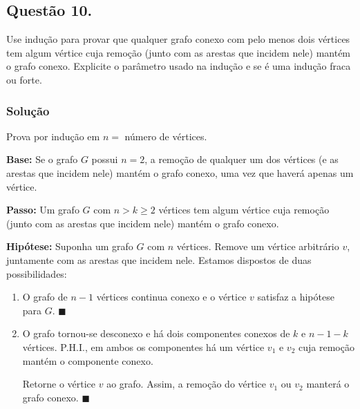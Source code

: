 \documentclass[12pt, letterpaper]{report}
\newcommand*{\CQD}{\hfill\ensuremath{\blacksquare}}%
\newcounter{ProblemNum}
\newcommand*{\anyproblem}[1]{\newpage\subsection*{#1}}
\newcommand*{\problem}[1]{\stepcounter{ProblemNum} %
   \anyproblem{Questão #1}}
\newcommand*{\soln}[1]{\subsubsection*{#1}}
\newcommand*{\solution}{\soln{Solução}}
\begin{document}
\problem{10.}
  Use indução para provar que qualquer grafo conexo com pelo menos dois vértices tem algum vértice cuja remoção (junto com as arestas que incidem nele) mantém o grafo conexo. Explicite o parâmetro usado na indução e se é uma indução fraca ou forte.

\solution
  Prova por indução em $n =$ número de vértices.

  \textbf{Base:} Se o grafo $G$ possui $n = 2$, a remoção de qualquer um dos vértices (e as arestas que incidem nele) mantém o grafo conexo, uma vez que haverá apenas um vértice.

  \textbf{Passo:} Um grafo $G$ com $n > k \geq 2$ vértices tem algum vértice cuja remoção (junto com as arestas que incidem nele) mantém o grafo conexo.

  \textbf{Hipótese:} Suponha um grafo $G$ com $n$ vértices. Remove um vértice arbitrário $v$, juntamente com as arestas que incidem nele. Estamos dispostos de duas possibilidades:

  \begin{enumerate}
    \item O grafo de $n - 1$ vértices continua conexo e o vértice $v$ satisfaz a hipótese para $G$. \CQD
    \item O grafo tornou-se desconexo e há dois componentes conexos de $k$ e $n - 1 - k$ vértices. P.H.I., em ambos os componentes há um vértice $v_1$ e $v_2$ cuja remoção mantém o componente conexo. 

    Retorne o vértice $v$ ao grafo. Assim, a remoção do vértice $v_1$ ou $v_2$ manterá o grafo conexo. \CQD
  \end{enumerate}
\end{document}
